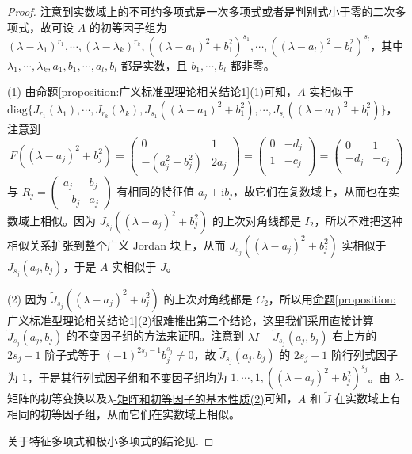 \documentclass[../../main.tex]{subfiles}
\begin{document}
\begin{proof}
注意到实数域上的不可约多项式是一次多项式或者是判别式小于零的二次多项式，故可设 $A$ 的初等因子组为 $(\lambda - \lambda_1)^{r_1},\cdots,(\lambda - \lambda_k)^{r_k},((\lambda - a_1)^2 + b_1^2)^{s_1},\cdots,((\lambda - a_l)^2 + b_l^2)^{s_l}$，其中 $\lambda_1,\cdots,\lambda_k,a_1,b_1,\cdots,a_l,b_l$ 都是实数，且 $b_1,\cdots,b_l$ 都非零。

(1) 由\hyperref[proposition:广义标准型理论相关结论1]{命题\ref{proposition:广义标准型理论相关结论1}(1)}可知，$A$ 实相似于 $\mathrm{diag}\{J_{r_1}(\lambda_1),\cdots,J_{r_k}(\lambda_k),J_{s_1}((\lambda - a_1)^2 + b_1^2),\cdots,J_{s_l}((\lambda - a_l)^2 + b_l^2)\}$，注意到 
$$
F((\lambda - a_j)^2 + b_j^2) = \begin{pmatrix}0 & 1 \\ -(a_j^2 + b_j^2) & 2a_j\end{pmatrix}=\left( \begin{matrix}
0&		-d_j\\
1&		-c_j\\
\end{matrix} \right) =\left( \begin{matrix}
0&		1\\
-d_j&		-c_j\\
\end{matrix} \right) 
$$
与 $R_j = \begin{pmatrix}a_j & b_j \\ -b_j & a_j\end{pmatrix}$ 有相同的特征值 $a_j\pm \mathrm{i}b_j$，故它们在复数域上，从而也在实数域上相似。因为 $J_{s_j}((\lambda - a_j)^2 + b_j^2)$ 的上次对角线都是 $I_2$，所以不难把这种相似关系扩张到整个广义 Jordan 块上，从而 $J_{s_j}((\lambda - a_j)^2 + b_j^2)$ 实相似于 $J_{s_j}(a_j,b_j)$，于是 $A$ 实相似于 $J$。

(2) 因为 $\widetilde{J}_{s_j}((\lambda - a_j)^2 + b_j^2)$ 的上次对角线都是 $C_2$，所以用\hyperref[proposition:广义标准型理论相关结论1]{命题\ref{proposition:广义标准型理论相关结论1}(2)}很难推出第二个结论，这里我们采用直接计算 $\widetilde{J}_{s_j}(a_j,b_j)$ 的不变因子组的方法来证明。注意到 $\lambda I - \widetilde{J}_{s_j}(a_j,b_j)$ 右上方的 $2s_j - 1$ 阶子式等于 $(-1)^{2s_j - 1}b_j^{s_j}\neq 0$，故 $\widetilde{J}_{s_j}(a_j,b_j)$ 的 $2s_j - 1$ 阶行列式因子为 $1$，于是其行列式因子组和不变因子组均为 $1,\cdots,1,((\lambda - a_j)^2 + b_j^2)^{s_j}$。由 $\lambda$-矩阵的初等变换以及\hyperref[theorem:lambda-矩阵和初等因子的基本性质]{$\lambda$-矩阵和初等因子的基本性质(2)}可知，$A$ 和 $\widetilde{J}$ 在实数域上有相同的初等因子组，从而它们在实数域上相似。

关于特征多项式和极小多项式的结论见.
\end{proof}
\end{document}
